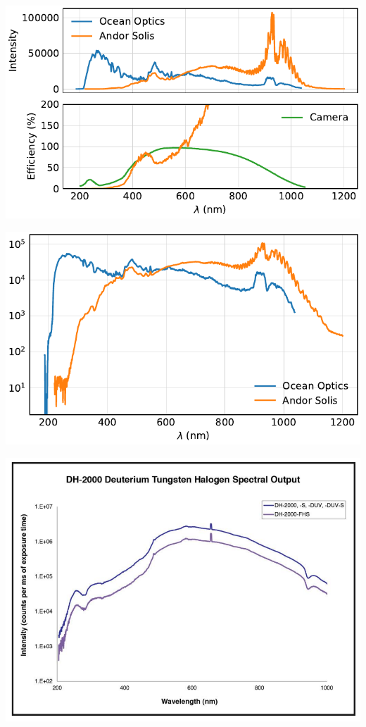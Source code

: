 \begin{frame}
	\centering
	\includegraphics{../analysis/figures/efficiency.pdf}
\end{frame}

\begin{frame}
	\centering
	\includegraphics{../analysis/figures/efficiency_spectrum.pdf}
\end{frame}

\begin{frame}
	\centering
	\includegraphics[width=.8\textwidth]{./figures/dh-2000.png}
\end{frame}

